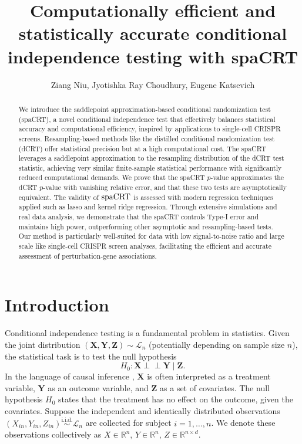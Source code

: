 \documentclass[12pt]{article}
\title{Computationally efficient and statistically accurate conditional independence testing with spaCRT}
\theoremstyle{definition}
\newcommand{\indep}{\perp \!\!\! \perp}
\newcommand{\R}{\mathbb{R}}								%
\newcommand{\iidsim}{\stackrel{\mathrm{i.i.d.}}{\sim}} 	%
\newcommand{\prx}{\bm X}								%
\newcommand{\srx}{X}									%
\newcommand{\prz}{\bm Z}								%
\newcommand{\srz}{Z}									%
\newcommand{\pry}{{\bm Y}}								%
\newcommand{\sry}{Y}									%
\newcommand{\law}{\mathcal L}							%
\newcommand{\spacrt}{\textnormal{spaCRT}}               %
\begin{document}
\author{Ziang Niu, Jyotishka Ray Choudhury, Eugene Katsevich}
\maketitle


\begin{abstract}
  We introduce the saddlepoint approximation-based conditional randomization test (spaCRT), a novel conditional independence test that effectively balances statistical accuracy and computational efficiency, inspired by applications to single-cell CRISPR screens. Resampling-based methods like the distilled conditional randomization test (dCRT) offer statistical precision but at a high computational cost. The spaCRT leverages a saddlepoint approximation to the resampling distribution of the dCRT test statistic, achieving very similar finite-sample statistical performance with significantly reduced computational demands. We prove that the spaCRT $p$-value approximates the dCRT $p$-value with vanishing relative error, and that these two tests are asymptotically equivalent. The validity of $\spacrt$ is assessed with modern regression techniques applied such as lasso and kernel ridge regression. Through extensive simulations and real data analysis, we demonstrate that the spaCRT controls Type-I error and maintains high power, outperforming other asymptotic and resampling-based tests. Our method is particularly well-suited for data with low signal-to-noise ratio and large scale like single-cell CRISPR screen analyses, facilitating the efficient and accurate assessment of perturbation-gene associations.
\end{abstract}

\section{Introduction} \label{sec:introduction}

Conditional independence testing is a fundamental problem in statistics. Given the joint distribution $(\prx, \pry, \prz) \sim \law_n$ (potentially depending on sample size $n$), the statistical task is to test the null hypothesis 
\begin{equation}\label{eq:conditional-independent-null}
H_0: \prx \indep \pry \mid \prz. 
\end{equation}
In the language of causal inference \citep{imbens2015causal}, $\prx$ is often interpreted as a treatment variable, $\pry$ as an outcome variable, and $\prz$ as a set of covariates. The null hypothesis $H_0$ states that the treatment has no effect on the outcome, given the covariates. Suppose the independent and identically distributed observations $(\srx_{in}, \sry_{in}, \srz_{in}) \iidsim \law_n$ are collected for subject $i = 1, \dots, n$. We denote these observations collectively as $\srx \in \R^n$, $\sry \in \R^n$, $\srz \in \R^{n \times d}$.
\end{document}

